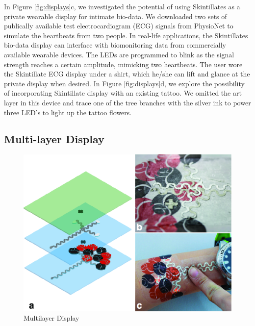\documentclass{sigchi}
\begin{document}
In Figure \ref{fig:displays}c, we investigated the potential of using Skintillates as a private wearable display for intimate bio-data. We downloaded two sets of publically available test electrocardiogram (ECG) signals from PhysioNet to simulate the heartbeats from two people. In real-life applications, the Skintillates bio-data display can interface with biomonitoring data from commercially available wearable devices. The LEDs are programmed to blink as the signal strength reaches a certain amplitude, mimicking two heartbeats. The user wore the Skintillate ECG display under a shirt, which he/she can lift and glance at the private display when desired. In Figure \ref{fig:displays}d, we explore the possibility of incorporating Skintillate display with an existing tattoo. We omitted the art layer in this device and trace one of the tree branches with the silver ink to power three LED's to light up the tattoo flowers. 

\subsection{Multi-layer Display}
\begin{figure}
\centering
\includegraphics[width=1\columnwidth]{figures/Figure6}
\caption{Multilayer Display}
\vspace{-8pt}
\label{fig:multilayer}
\end{figure}
\end{document}
